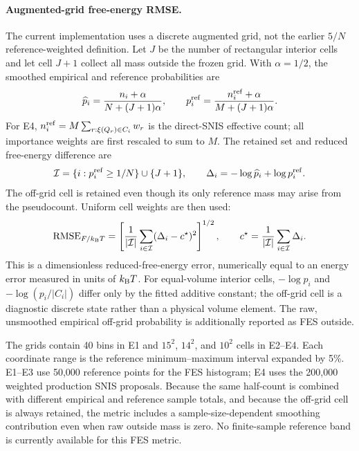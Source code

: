 \documentclass[11pt]{article}
\begin{document}
\paragraph{Augmented-grid free-energy RMSE.}
The current implementation uses a discrete augmented grid, not the earlier
$5/N$ reference-weighted definition.  Let $J$ be the number of rectangular
interior cells and let cell $J+1$ collect all mass outside the frozen grid.
With $\alpha=1/2$, the smoothed empirical and reference probabilities are
\begin{equation}
 \widehat p_i=\frac{n_i+\alpha}{N+(J+1)\alpha},\qquad
 p_i^{\rm ref}=\frac{n_i^{\rm ref}+\alpha}{M+(J+1)\alpha}.
\end{equation}
For E4, $n_i^{\rm ref}=M\sum_{r:\xi(Q_r)\in C_i}w_r$ is the direct-SNIS
effective
count; all importance weights are first rescaled to sum to $M$.  The retained
set and reduced free-energy difference are
\begin{equation}
 \mathcal I=\{i:p_i^{\rm ref}\ge 1/N\}\cup\{J+1\},\qquad
 \Delta_i=-\log\widehat p_i+\log p_i^{\rm ref} .
\end{equation}
The off-grid cell is retained even though its only reference mass may arise
from the pseudocount.  Uniform cell weights are then used:
\begin{equation}
 \operatorname{RMSE}_{F/k_{\rm B}T}
 =\left[\frac1{|\mathcal I|}
       \sum_{i\in\mathcal I}(\Delta_i-c^\star)^2\right]^{1/2},
 \qquad
 c^\star=\frac1{|\mathcal I|}\sum_{i\in\mathcal I}\Delta_i .
\end{equation}
This is a dimensionless reduced-free-energy error, numerically equal to an
energy error measured in units of $k_{\rm B}T$.  For equal-volume interior
cells, $-\log p_i$ and $-\log(p_i/|C_i|)$ differ only by the fitted additive
constant; the off-grid cell is a diagnostic discrete state rather than a
physical volume element.  The raw, unsmoothed empirical off-grid probability
is additionally reported as FES outside.

The grids contain 40 bins in E1 and $15^2$, $14^2$, and $10^2$ cells in
E2--E4.  Each coordinate range is the reference minimum--maximum interval
expanded by 5\%.  E1--E3 use 50,000 reference points for the FES histogram;
E4 uses the 200,000 weighted production SNIS proposals.  Because the same
half-count is combined with different empirical and reference sample totals,
and because the off-grid cell is always retained, the metric includes a
sample-size-dependent smoothing contribution even when raw outside mass is
zero.  No finite-sample reference band is currently available for this FES
metric.
\end{document}
